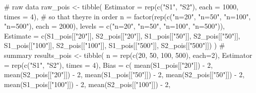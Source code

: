 \documentclass[
]{article}
\newenvironment{Shaded}{\begin{snugshade}}{\end{snugshade}}
\newcommand{\AttributeTok}[1]{\textcolor[rgb]{0.40,0.45,0.13}{#1}}
\newcommand{\CommentTok}[1]{\textcolor[rgb]{0.37,0.37,0.37}{#1}}
\newcommand{\DecValTok}[1]{\textcolor[rgb]{0.68,0.00,0.00}{#1}}
\newcommand{\FunctionTok}[1]{\textcolor[rgb]{0.28,0.35,0.67}{#1}}
\newcommand{\NormalTok}[1]{\textcolor[rgb]{0.00,0.23,0.31}{#1}}
\newcommand{\OtherTok}[1]{\textcolor[rgb]{0.00,0.23,0.31}{#1}}
\newcommand{\SpecialCharTok}[1]{\textcolor[rgb]{0.37,0.37,0.37}{#1}}
\newcommand{\StringTok}[1]{\textcolor[rgb]{0.13,0.47,0.30}{#1}}
\begin{document}
\begin{Shaded}
\begin{Highlighting}[numbers=left,,]
\CommentTok{\# raw data }
\NormalTok{raw\_pois }\OtherTok{\textless{}{-}} \FunctionTok{tibble}\NormalTok{(}
  \AttributeTok{Estimator =} \FunctionTok{rep}\NormalTok{(}\FunctionTok{c}\NormalTok{(}\StringTok{"S1"}\NormalTok{, }\StringTok{"S2"}\NormalTok{), }\AttributeTok{each =} \DecValTok{1000}\NormalTok{, }\AttributeTok{times =} \DecValTok{4}\NormalTok{),}
  \CommentTok{\# so that they\textquotesingle{}re in order}
  \AttributeTok{n =} \FunctionTok{factor}\NormalTok{(}\FunctionTok{rep}\NormalTok{(}\FunctionTok{c}\NormalTok{(}\StringTok{"n=20"}\NormalTok{, }\StringTok{"n=50"}\NormalTok{, }\StringTok{"n=100"}\NormalTok{, }\StringTok{"n=500"}\NormalTok{), }\AttributeTok{each =} \DecValTok{2000}\NormalTok{),}
            \AttributeTok{levels =} \FunctionTok{c}\NormalTok{(}\StringTok{"n=20"}\NormalTok{, }\StringTok{"n=50"}\NormalTok{, }\StringTok{"n=100"}\NormalTok{, }\StringTok{"n=500"}\NormalTok{)),}
  \AttributeTok{Estimate =} \FunctionTok{c}\NormalTok{(S1\_pois[[}\StringTok{"20"}\NormalTok{]], S2\_pois[[}\StringTok{"20"}\NormalTok{]],}
\NormalTok{              S1\_pois[[}\StringTok{"50"}\NormalTok{]], S2\_pois[[}\StringTok{"50"}\NormalTok{]],}
\NormalTok{              S1\_pois[[}\StringTok{"100"}\NormalTok{]], S2\_pois[[}\StringTok{"100"}\NormalTok{]],}
\NormalTok{              S1\_pois[[}\StringTok{"500"}\NormalTok{]], S2\_pois[[}\StringTok{"500"}\NormalTok{]])}
\NormalTok{)}
\CommentTok{\# summary }
\NormalTok{results\_pois }\OtherTok{\textless{}{-}} \FunctionTok{tibble}\NormalTok{(}
  \AttributeTok{n =} \FunctionTok{rep}\NormalTok{(}\FunctionTok{c}\NormalTok{(}\DecValTok{20}\NormalTok{, }\DecValTok{50}\NormalTok{, }\DecValTok{100}\NormalTok{, }\DecValTok{500}\NormalTok{), }\AttributeTok{each=}\DecValTok{2}\NormalTok{),}
  \AttributeTok{Estimator =} \FunctionTok{rep}\NormalTok{(}\FunctionTok{c}\NormalTok{(}\StringTok{"S1"}\NormalTok{, }\StringTok{"S2"}\NormalTok{), }\AttributeTok{times =} \DecValTok{4}\NormalTok{),}
  \AttributeTok{Bias =} \FunctionTok{c}\NormalTok{(}
    \FunctionTok{mean}\NormalTok{(S1\_pois[[}\StringTok{"20"}\NormalTok{]]) }\SpecialCharTok{{-}} \DecValTok{2}\NormalTok{, }\FunctionTok{mean}\NormalTok{(S2\_pois[[}\StringTok{"20"}\NormalTok{]]) }\SpecialCharTok{{-}} \DecValTok{2}\NormalTok{,}
    \FunctionTok{mean}\NormalTok{(S1\_pois[[}\StringTok{"50"}\NormalTok{]]) }\SpecialCharTok{{-}} \DecValTok{2}\NormalTok{, }\FunctionTok{mean}\NormalTok{(S2\_pois[[}\StringTok{"50"}\NormalTok{]]) }\SpecialCharTok{{-}} \DecValTok{2}\NormalTok{,}
    \FunctionTok{mean}\NormalTok{(S1\_pois[[}\StringTok{"100"}\NormalTok{]]) }\SpecialCharTok{{-}} \DecValTok{2}\NormalTok{, }\FunctionTok{mean}\NormalTok{(S2\_pois[[}\StringTok{"100"}\NormalTok{]]) }\SpecialCharTok{{-}} \DecValTok{2}\NormalTok{,}

\end{Highlighting}
\end{Shaded}
\end{document}
